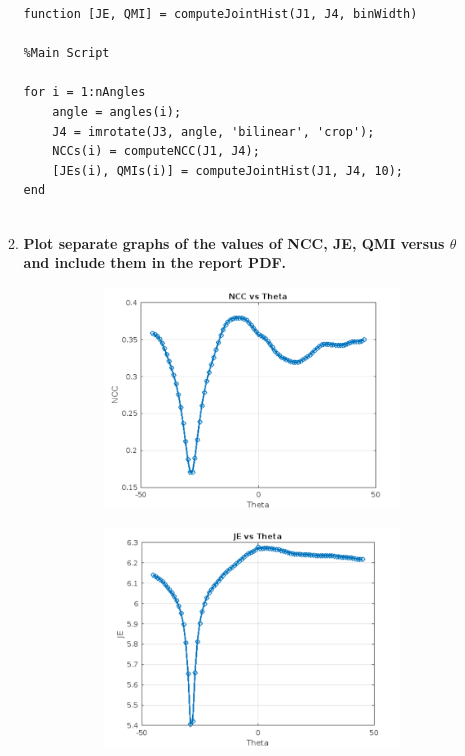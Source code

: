 \documentclass{article}
\begin{document}
\begin{enumerate}
\begin{enumerate}
\begin{verbatim}
function [JE, QMI] = computeJointHist(J1, J4, binWidth)

%Main Script

for i = 1:nAngles
    angle = angles(i);
    J4 = imrotate(J3, angle, 'bilinear', 'crop');
    NCCs(i) = computeNCC(J1, J4);
    [JEs(i), QMIs(i)] = computeJointHist(J1, J4, 10);
end


\end{verbatim}

\item \textbf{Plot separate graphs of the values of NCC, JE, QMI versus $\theta$ and include them in the report PDF. }
\\

\begin{figure}[h]
    \centering
    \begin{subfigure}[b]{0.45\textwidth}
        \centering
        \includegraphics[width=\textwidth]{NCC_vs_Theta.png}
    \end{subfigure}
    \hfill
    \begin{subfigure}[b]{0.45\textwidth}
        \centering
        \includegraphics[width=\textwidth]{JE_vs_Theta.png}

\end{subfigure}
\end{figure}
\end{enumerate}
\end{enumerate}
\end{document}
